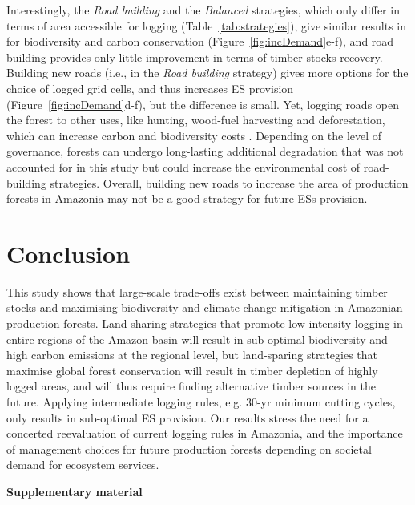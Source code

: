 \documentclass{article}
\newcommand{\beginsupplement}{%
        \setcounter{table}{0}
        \renewcommand{\thetable}{S\arabic{table}}%
        \setcounter{figure}{0}
        \renewcommand{\thefigure}{S\arabic{figure}}%
     }
\begin{document}
Interestingly, the \textit{Road building} and the \textit{Balanced} strategies, which only differ in terms of area accessible for logging (Table~\ref{tab:strategies}), give similar results in for biodiversity and carbon conservation (Figure~\ref{fig:incDemand}e-f), and road building provides only little improvement in terms of timber stocks recovery.
Building new roads (i.e., in the \textit{Road building} strategy) gives more options for the choice of logged grid cells, and thus increases ES provision (Figure~\ref{fig:incDemand}d-f), but the difference is small. 
Yet, logging roads open the forest to other uses, like hunting, wood-fuel harvesting and deforestation, which can increase carbon and biodiversity costs \cite{Laurance2009a}. Depending on the level of governance, forests can undergo long-lasting additional degradation that was not accounted for in this study but could increase the environmental cost of road-building strategies. Overall, building new roads to increase the area of production forests in Amazonia may not be a good strategy for future ESs provision. 

\section{Conclusion}

This study shows that large-scale trade-offs exist between maintaining timber stocks and maximising biodiversity and climate change mitigation in Amazonian production forests. Land-sharing strategies that promote low-intensity logging in entire regions of the Amazon basin will result in sub-optimal biodiversity and high carbon emissions at the regional level, but land-sparing strategies that maximise global forest conservation will result in timber depletion of highly logged areas, and will thus require finding alternative timber sources in the future. Applying intermediate logging rules, e.g. 30-yr minimum cutting cycles, only results in sub-optimal ES provision. Our results stress the need for a concerted reevaluation of current logging rules in Amazonia, and the importance of management choices for future production forests depending on societal demand for ecosystem services. 

\clearpage





\onecolumn
\beginsupplement
\appendix
\begin{center}
    { \huge \textbf{Supplementary material}}
\end{center} 
\end{document}
